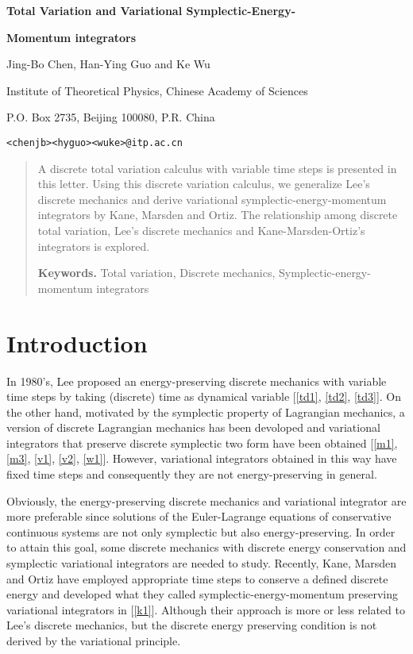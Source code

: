 \documentclass[a4paper,a4paper]{article}
\def\sect#1{\section{#1}\setcounter{equation}{0}}
\begin{document}
\centerline{} \vskip0.5cm \centerline{\LARGE \bf Total Variation
and  Variational Symplectic-Energy- } \vskip3pt \centerline{\LARGE \bf
Momentum integrators } \vskip0.7cm \centerline{\large
Jing-Bo Chen,\myHighlight{$\quad$}\coordHE{}  Han-Ying Guo\myHighlight{$\quad$}\coordHE{}   and\myHighlight{$\quad$}\coordHE{}  Ke Wu}
\vskip3pt \centerline{\small Institute of Theoretical Physics,
Chinese Academy of Sciences} \vskip3pt \centerline{\small P.O. Box
2735, Beijing 100080, P.R. China} \vskip3pt \centerline{\small
\texttt{<chenjb><hyguo><wuke>@itp.ac.cn}} \vskip3pt



\begin{abstract}
A   discrete total variation calculus with variable time steps is
presented in this letter. Using this discrete variation calculus,
we generalize
Lee's discrete mechanics and derive variational
symplectic-energy-momentum integrators by Kane, Marsden and Ortiz.
The relationship among discrete total variation, Lee's discrete
mechanics and Kane-Marsden-Ortiz's integrators is explored.

\vskip8pt {\bf Keywords.} Total variation, Discrete mechanics,
Symplectic-energy-momentum integrators
\end{abstract}



\sect{Introduction}

In 1980's, Lee  proposed an energy-preserving discrete
mechanics with variable time steps by taking (discrete) time as
dynamical variable [\ref{td1}, \ref{td2}, \ref{td3}]. On the other
hand, motivated by the symplectic property of Lagrangian
mechanics, a version of discrete Lagrangian
mechanics has been devoloped and  variational integrators that preserve
discrete symplectic two form  have been obtained 
[\ref{m1}, \ref{m3}, \ref{v1}, \ref{v2}, \ref{w1}].
However,  variational integrators
obtained in this way have fixed time steps and consequently they
are not energy-preserving in general.

 Obviously,
the energy-preserving discrete mechanics and variational
integrator are more preferable since  solutions of the
Euler-Lagrange equations of conservative continuous systems are
not only symplectic but also energy-preserving. In order to attain
this goal, some discrete mechanics with discrete energy
conservation and  symplectic variational integrators are needed to
study.  Recently, Kane, Marsden and Ortiz have employed
appropriate  time steps to conserve a defined discrete energy and
developed what they called symplectic-energy-momentum preserving
variational integrators in [\ref{k1}]. Although their approach is
more or less related to Lee's discrete mechanics, but the discrete
energy preserving condition is not derived by the variational
principle.
\end{document}
